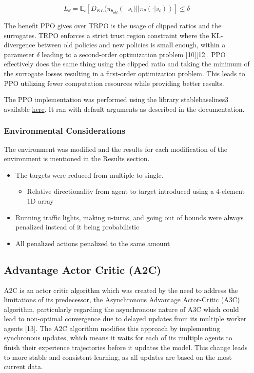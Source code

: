 \documentclass{article}
\begin{document}
	\begin{equation}
		L_{\theta} = \mathbb{E}_{t}[D_{KL}(\pi_{\theta_{old}}(\cdot|s_{t}) || \pi_{\theta}(\cdot|s_{t}))] \leq \delta
	\end{equation}
	
	The benefit PPO gives over TRPO is the usage of clipped ratios and the surrogates. TRPO enforces a strict trust region constraint where the KL-divergence between old policies and new policies is small enough, within a parameter $\delta$ leading to a second-order optimization problem [10][12]. PPO effectively does the same thing using the clipped ratio and taking the minimum of the surrogate losses resulting in a first-order optimization problem. This leads to PPO utilizing fewer computation resources while providing better results.
	
	The PPO implementation was performed using the library stable\textunderscore baselines3 available  \href{https://stable-baselines3.readthedocs.io/en/master/}{here}. It ran with default arguments as described in the documentation.
	
	\subsubsection{Environmental Considerations}
	\label{considerations}
	The environment was modified and the results for each modification of the environment is mentioned in the Results section.
	\begin{itemize}
		\item The targets were reduced from multiple to single. 
		\begin{itemize}
			\item Relative directionality from agent to target introduced using a 4-element 1D array
		\end{itemize}
		\item Running traffic lights, making u-turns, and going out of bounds were always penalized instead of it being probabilistic
		\item All penalized actions penalized to the same amount
	\end{itemize}
	
	\subsection{Advantage Actor Critic (A2C)}
	\label{a2c}
	A2C is an actor critic algorithm which was created by the need to address the limitations of its predecessor, the Asynchronous Advantage Actor-Critic (A3C) algorithm, particularly regarding the asynchronous nature of A3C which could lead to non-optimal convergence due to delayed updates from its multiple worker agents [13]. The A2C algorithm modifies this approach by implementing synchronous updates, which means it waits for each of its multiple agents to finish their experience trajectories before it updates the model. This change leads to more stable and consistent learning, as all updates are based on the most current data.
	
\end{document}
